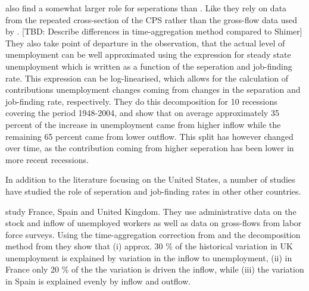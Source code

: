 \cite{Elsby2009b} also find a somewhat larger role for seperations than \cite{Shimer2012}. Like \cite{Shimer2005} they rely on data from the repeated cross-section of the CPS rather than the gross-flow data used by \cite{Fujita2008}. [TBD: Describe differences in time-aggregation method compared to Shimer] They also take point of departure in the observation, that the actual level of unemployment can be well approximated using the expression for steady state unemployment which is written as a function of the seperation and job-finding rate. This expression can be log-linearised, which allows for the calculation of contributions unemployment changes coming from changes in the separation and job-finding rate, respectively. They do this decomposition for 10 recessions covering the period 1948-2004, and show that on average approximately 35 percent of the increase in unemployment came from higher inflow while the remaining 65 percent came from lower outflow. This split has however changed over time, as the contribution coming from higher seperation has been lower in more recent recessions. 

In addition to the literature focusing on the United States, a number of studies have studied the role of seperation and job-finding rates in other other countries. 

\cite{Petrongolo2008} study France, Spain and United Kingdom. They use administrative data on the stock and inflow of unemployed workers as well as data on gross-flows from labor force surveys. Using the time-aggregation correction from \cite{Shimer2012} and the decomposition method from \cite{Fujita2009} they show that (i) approx. 30 \% of the historical variation in UK unemployment is explained by variation in the inflow to unemployment, (ii) in France only 20 \% of the the variation is driven the inflow, while (iii) the variation in Spain is explained evenly by inflow and outflow.  

